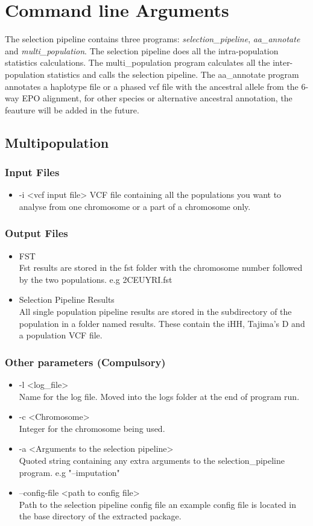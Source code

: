 \documentclass[a4paper,10pt]{article}
\begin{document}
\section{Command line Arguments}
The selection pipeline contains three programs:
\emph{selection\_pipeline}, \emph{aa\_annotate} and
\emph{multi\_population}. The selection pipeline does all the
intra-population statistics calculations. The multi\_population program
calculates all the inter-population statistics and calls the selection
pipeline. The aa\_annotate program annotates a haplotype file or a
phased vcf file with the ancestral allele from the 6-way EPO
alignment, for other species or alternative ancestral annotation, the
feauture will be added in the future.

\subsection{Multipopulation}
\subsubsection{Input Files}
\begin{itemize}
\item -i <vcf input file>
VCF file containing all the populations you want to analyse from one chromosome or a part of a chromosome only. 
\end{itemize}
\subsubsection{Output Files}
\begin{itemize}
\item FST \\
Fst results are stored in the fst folder with the chromosome number followed by the two populations. e.g 2CEUYRI.fst
\item Selection Pipeline Results\\
All single population pipeline results are stored in the subdirectory of the population in a folder named results. These contain the iHH, Tajima's D and a population VCF file.
\end{itemize}
\subsubsection{Other parameters (Compulsory)}
\begin{itemize}
\item -l <log\_file> \\
Name for the log file. Moved into the logs folder at the end of program run.
\item -c <Chromosome>\\
Integer for the chromosome being used.
\item -a <Arguments to the selection pipeline>\\
Quoted string containing any extra arguments to the selection\_pipeline program. e.g "--imputation"
\item --config-file <path to config file>\\
Path to the selection pipeline config file an example config file is located in the base directory of the extracted package.
\end{itemize}
\end{document}
